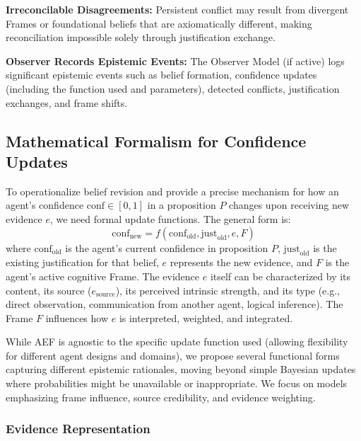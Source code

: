 \documentclass[10pt,a4paper]{article}
\begin{document}
\textbf{Irreconcilable Disagreements:} Persistent conflict may result from divergent Frames or foundational beliefs that are axiomatically different, making reconciliation impossible solely through justification exchange.

\textbf{Observer Records Epistemic Events:} The Observer Model (if active) logs significant epistemic events such as belief formation, confidence updates (including the function used and parameters), detected conflicts, justification exchanges, and frame shifts.

\subsection{Mathematical Formalism for Confidence Updates}
\label{sec:math_formalism}

To operationalize belief revision and provide a precise mechanism for how an agent's confidence $\mathrm{conf} \in [0, 1]$ in a proposition $P$ changes upon receiving new evidence $e$, we need formal update functions. The general form is:
$$ \mathrm{conf}_{\mathrm{new}} = f(\mathrm{conf}_{\mathrm{old}}, \mathrm{just}_{\mathrm{old}}, e, F) $$
where $\mathrm{conf}_{\mathrm{old}}$ is the agent's current confidence in proposition $P$, $\mathrm{just}_{\mathrm{old}}$ is the existing justification for that belief, $e$ represents the new evidence, and $F$ is the agent's active cognitive Frame. The evidence $e$ itself can be characterized by its content, its source ($e_{\mathrm{source}}$), its perceived intrinsic strength, and its type (e.g., direct observation, communication from another agent, logical inference). The Frame $F$ influences how $e$ is interpreted, weighted, and integrated.

While AEF is agnostic to the specific update function used (allowing flexibility for different agent designs and domains), we propose several functional forms capturing different epistemic rationales, moving beyond simple Bayesian updates where probabilities might be unavailable or inappropriate. We focus on models emphasizing frame influence, source credibility, and evidence weighting.

\subsubsection{Evidence Representation}
\end{document}
